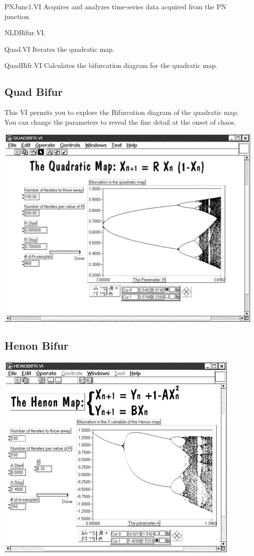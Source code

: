 \documentclass{../lab}
\begin{document}
PNJunc1.VI Acquires and analyzes time-series data acquired from the PN junction

NLDBifur.VI.

Quad.VI Iterates the quadratic map.

QuadBifr.VI Calculates the bifurcation diagram for the quadratic map.

\subsection{Quad Bifur}

This VI permits you to explore the Bifurcation diagram of the quadratic map. You can change the parameters to reveal the fine detail at the onset of chaos.

\begin{center}
    \href{http://experimentationlab.berkeley.edu/sites/default/files/images/Nldimage138.gif}{\includegraphics[width=0.5\linewidth]{images/Nldimage138.png}}
\end{center}

\subsection{Henon Bifur}

\begin{center}
    \href{http://experimentationlab.berkeley.edu/sites/default/files/images/Nldimage139.gif}{\includegraphics[width=0.5\linewidth]{images/Nldimage139.png}}
\end{center}
\end{document}
